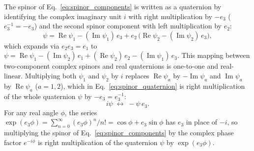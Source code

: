 \documentclass[aps,prd,onecolumn,tightenlines,nofootinbib,notitlepage,11pt,floatfix]{revtex4-2}
\theoremstyle{indentedtheorem}
\begin{document}
The spinor of Eq.~\eqref{eq:spinor_components} is written as a quaternion by identifying the complex imaginary unit $i$ with right multiplication by $-e_3$ ($e_3^{-1}=-e_3$) and the second spinor component with left multiplication by $e_2$:
\begin{equation}
    \psi = \operatorname{Re}\psi_1 - (\operatorname{Im}\psi_1) \, e_3 + e_2 \, \big(\operatorname{Re}\psi_2 - (\operatorname{Im}\psi_2) \, e_3\big) ,
    \label{eq:spinor_quaternion}
\end{equation}
which expands via $e_2e_3=e_1$ to $\psi = \operatorname{Re}\psi_1 - (\operatorname{Im}\psi_2)\,e_1 + (\operatorname{Re}\psi_2)\,e_2 - (\operatorname{Im}\psi_1)\,e_3$. This mapping between two-component complex spinors and real quaternions is one-to-one and real-linear. Multiplying both $\psi_1$ and $\psi_2$ by $i$ replaces $\operatorname{Re}\psi_a$ by $-\operatorname{Im}\psi_a$ and $\operatorname{Im}\psi_a$ by $\operatorname{Re}\psi_a$ ($a=1,2$), which in Eq.~\eqref{eq:spinor_quaternion} is right multiplication of the whole quaternion $\psi$ by $-e_3=e_3^{-1}$:
\begin{equation}
    i\psi \;\longleftrightarrow\; -\psi\,e_3 .
    \label{eq:i_right_e3}
\end{equation}
For any real angle $\phi$, the series $\exp(e_3\phi)=\sum_{n=0}^\infty(e_3\phi)^n/n!=\cos\phi+e_3\sin\phi$ has $e_3$ in place of $-i$, so multiplying the spinor of Eq.~\eqref{eq:spinor_components} by the complex phase factor $e^{-i\phi}$ is right multiplication of the quaternion $\psi$ by $\exp(e_3\phi)$.
\end{document}

